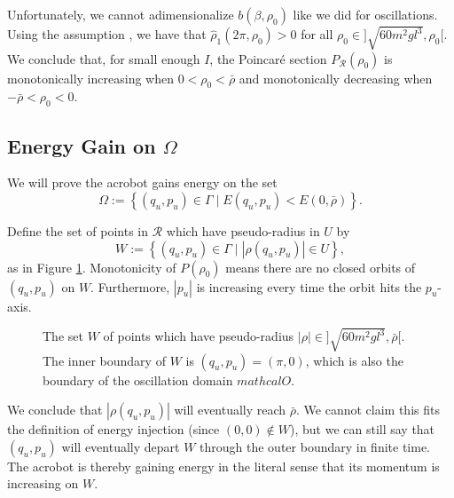 Unfortunately, we cannot adimensionalize
\(b(\beta,\rho_0)\) like we did for oscillations. 
Using the assumption , we have that 
\(\hat{\rho}_1(2\pi,\rho_0) > 0 \) for all 
\(\rho_0 \in ]\sqrt{60m^2gl^3},\rho_0[\).
We conclude that, for small enough \(I\), the Poincar\'{e} section 
\(P_\mathcal{R}(\rho_0)\) is monotonically increasing when 
\(0 < \rho_0 < \bar{\rho}\) and
monotonically decreasing when \(-\bar{\rho} < \rho_0 < 0\).  

\subsection*{Energy Gain on \(\Omega\)}
We will prove the acrobot gains energy on the set 
\[
    \Omega := \left\{ (q_u,p_u) \in \Gamma 
     \mid E(q_u,p_u) < E(0,\bar{\rho}) \right\}
    .
\]

Define the set of points in \(\mathcal{R}\) which have pseudo-radius in \(U\) by
\[
    W := \left\{(q_u,p_u) \in \Gamma \mid |\rho(q_u,p_u)| \in U \right\}
    ,
\]
as in Figure \ref{fig:acrobot-rot-W}.
Monotonicity of \(P(\rho_0)\) means there are no closed orbits of 
\((q_u,p_u)\) on \(W\). 
Furthermore, \(|p_u|\) is increasing every time the orbit hits the
\(p_u\)-axis. 

\begin{figure}
    \centering
    \caption{The set \(W\) of points which have pseudo-radius 
        \(|\rho| \in ]\sqrt{60m^2gl^3}, \bar{\rho}[\). The inner boundary of \(W\)
        is \((q_u,p_u) = (\pi,0)\), which is also the boundary of the
        oscillation domain \(mathcal{O}\).}
    \label{fig:acrobot-rot-W}
\end{figure}

We conclude that \(|\rho(q_u,p_u)|\) will eventually reach \(\bar{\rho}\). 
We cannot claim this fits the definition  of energy injection 
(since \((0,0) \notin W\)), but we can still say that \((q_u,p_u)\) will
eventually depart \(W\) through the outer boundary in finite time.
The acrobot is thereby gaining energy in the literal sense that its momentum
is increasing on \(W\).

